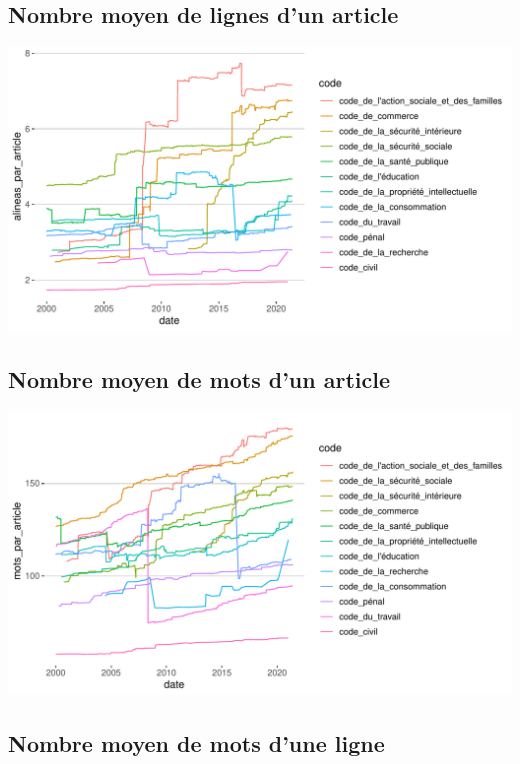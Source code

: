 \documentclass[
  oneside]{book}
\begin{document}
\hypertarget{nombre-moyen-de-lignes-dun-article}{%
\subsection{Nombre moyen de lignes d'un article}\label{nombre-moyen-de-lignes-dun-article}}

\includegraphics{05-images_files/figure-latex/alineas_par_article-1.pdf}

\hypertarget{nombre-moyen-de-mots-dun-article}{%
\subsection{Nombre moyen de mots d'un article}\label{nombre-moyen-de-mots-dun-article}}

\includegraphics{05-images_files/figure-latex/mots_par_article-1.pdf}

\hypertarget{nombre-moyen-de-mots-dune-ligne}{%
\subsection{Nombre moyen de mots d'une ligne}\label{nombre-moyen-de-mots-dune-ligne}}
\end{document}
